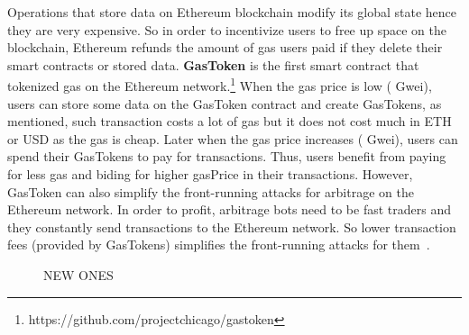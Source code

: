 Operations that store data on Ethereum blockchain modify its global state hence they are very expensive. So in order to incentivize users to free up space on the blockchain, Ethereum refunds the amount of gas users paid if they delete their smart contracts or stored data. \textbf{GasToken} is the first smart contract that tokenized gas on the Ethereum network.\footnote{https://github.com/projectchicago/gastoken} When the gas price is low ( Gwei), users can store some data on the GasToken contract and create GasTokens, as mentioned, such transaction costs a lot of gas but it does not cost much in ETH or USD as the gas is cheap. Later when the gas price increases ( Gwei), users can spend their GasTokens to pay for transactions. Thus, users benefit from paying for less gas and biding for higher \textsf{gasPrice} in their transactions. However, GasToken can also simplify the front-running attacks for arbitrage on the Ethereum network. In order to profit, arbitrage bots need to be fast traders and they constantly send transactions to the Ethereum network. So lower transaction fees (provided by GasTokens) simplifies the front-running attacks for them~\cite{Eskandari2019SoKTD}.





\begin{figure}[!htb]

	\centering
	\hfill
	\caption {NEW ONES}
	\label{fig:gas}

\end{figure}

